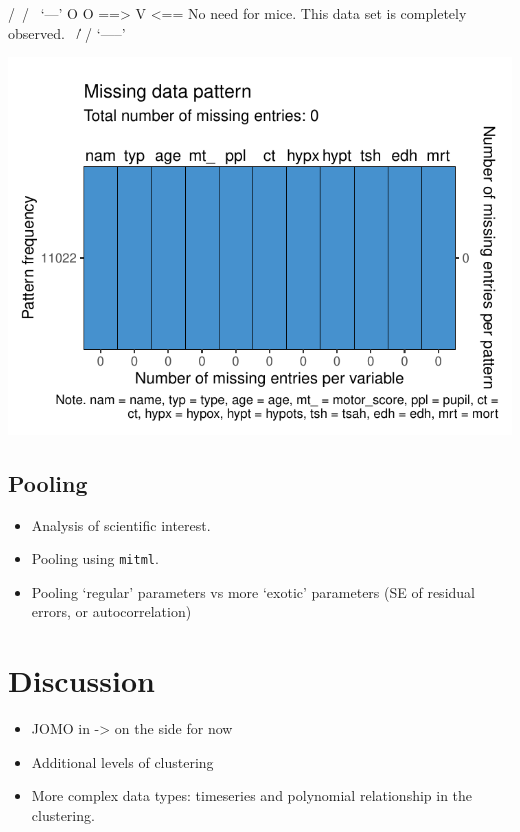 \documentclass[
]{jss}
\begin{document}
\begin{CodeChunk}
\begin{CodeOutput}
 /\     /\
{  `---'  }
{  O   O  }
==>  V <==  No need for mice. This data set is completely observed.
 \  \|/  /
  `-----'
\end{CodeOutput}


\begin{center}\includegraphics{Manuscript_files/figure-latex/impact-1} \end{center}

\end{CodeChunk}

\hypertarget{pooling}{%
\subsection{Pooling}\label{pooling}}

\begin{itemize}
\item
  Analysis of scientific interest.
\item
  Pooling using \texttt{mitml}.
\item
  Pooling `regular' parameters vs more `exotic' parameters (SE of
  residual errors, or autocorrelation)
\end{itemize}

\hypertarget{discussion}{%
\section{Discussion}\label{discussion}}

\begin{itemize}
\item
  JOMO in  -\textgreater{} on the side for now
\item
  Additional levels of clustering
\item
  More complex data types: timeseries and polynomial relationship in the
  clustering.
\end{itemize}
\end{document}

